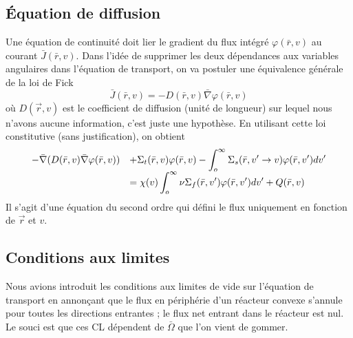 \subsection{Équation de diffusion}
Une équation de continuité doit lier le gradient du flux intégré $\varphi(\bar r,v)$ au courant 
$\bar J(\bar r, v)$. Dans l'idée de supprimer les deux dépendances aux variables angulaires dans 
l'équation de transport, on va postuler une équivalence générale de la loi de Fick
\begin{equation}
\bar J(\bar r,v) =  - D(\bar r,v)\bar \nabla \varphi (\bar r,v)
\end{equation}
où $D(\vec r, v)$ est le coefficient de diffusion (unité de longueur) sur lequel nous n'avons 
aucune information, c'est juste une hypothèse. En utilisant cette loi constitutive (sans 
justification), on obtient
\begin{equation}
\begin{array}{ll}
\displaystyle- \bar \nabla (D(\bar r,v)\bar \nabla \varphi (\bar r,v)) &\displaystyle+ {\Sigma _t}(\bar r,v)\varphi (\bar r,v) - \int_o^\infty    {\Sigma _s}(\bar r,v' \to v)\varphi (\bar r,v')dv'\\
&\displaystyle = \chi (v)\int_o^\infty    \nu {\Sigma _f}(\bar r,v')\varphi (\bar r,v')dv' + Q(\bar r,v)
\end{array}
\end{equation}
Il s'agit d'une équation du second ordre qui défini le flux uniquement en fonction de $\vec r$ et $v$.


\subsection{Conditions aux limites}
Nous avions introduit les conditions aux limites de vide sur l'équation de transport en annonçant 
que le flux en périphérie d'un réacteur convexe s'annule pour toutes les directions entrantes ; le 
flux net entrant dans le réacteur est nul. Le souci est que ces CL dépendent de $\bar\Omega$ que 
l'on vient de gommer. \\

